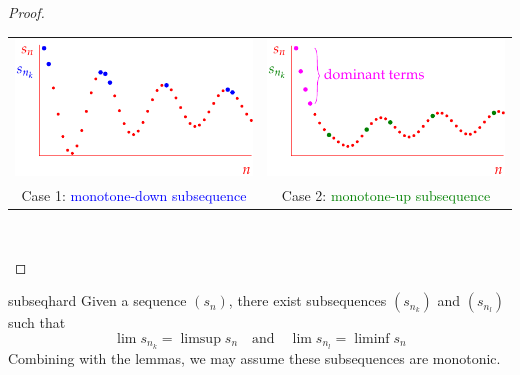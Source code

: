 \begin{proof}
	\begin{center}
		\begin{tabular}{c@{\qquad}c}
	  	\includegraphics[scale=1]{dominant1}&
	  	\includegraphics[scale=1]{dominant2}\\[-3pt]
	  	Case 1: \textcolor{blue}{monotone-down subsequence}&Case 2: \textcolor{Green}{monotone-up subsequence}
	  \end{tabular}\\[-8pt]
	  \hfill\qedhere
	\end{center}
\end{proof}


\goodbreak

\begin{thm}{}{subseqhard}
	Given a sequence $(s_n)$, there exist subsequences $(s_{n_k})$ and $(s_{n_l})$ such that
	\[\lim s_{n_k}=\limsup s_n\quad\text{and}\quad \lim s_{n_l}=\liminf s_n\]
	Combining with the lemmas, we may assume these subsequences are monotonic.
\end{thm}


